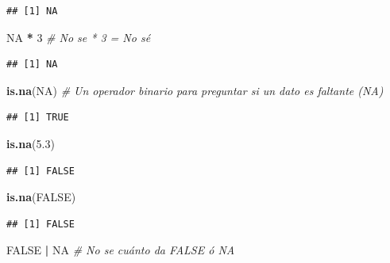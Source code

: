 \documentclass[]{book}
\newenvironment{Shaded}{\begin{snugshade}}{\end{snugshade}}
\newcommand{\KeywordTok}[1]{\textcolor[rgb]{0.13,0.29,0.53}{\textbf{#1}}}
\newcommand{\DecValTok}[1]{\textcolor[rgb]{0.00,0.00,0.81}{#1}}
\newcommand{\FloatTok}[1]{\textcolor[rgb]{0.00,0.00,0.81}{#1}}
\newcommand{\StringTok}[1]{\textcolor[rgb]{0.31,0.60,0.02}{#1}}
\newcommand{\CommentTok}[1]{\textcolor[rgb]{0.56,0.35,0.01}{\textit{#1}}}
\newcommand{\OtherTok}[1]{\textcolor[rgb]{0.56,0.35,0.01}{#1}}
\newcommand{\OperatorTok}[1]{\textcolor[rgb]{0.81,0.36,0.00}{\textbf{#1}}}
\newcommand{\NormalTok}[1]{#1}
\theoremstyle{definition}
\theoremstyle{definition}
\theoremstyle{definition}
\theoremstyle{remark}
\begin{document}
\begin{verbatim}
## [1] NA
\end{verbatim}

\begin{Shaded}
\begin{Highlighting}[]
\OtherTok{NA} \OperatorTok{*}\StringTok{ }\DecValTok{3} \CommentTok{# No se * 3 = No sé}
\end{Highlighting}
\end{Shaded}

\begin{verbatim}
## [1] NA
\end{verbatim}

\begin{Shaded}
\begin{Highlighting}[]
\KeywordTok{is.na}\NormalTok{(}\OtherTok{NA}\NormalTok{) }\CommentTok{# Un operador binario para preguntar si un dato es faltante (NA)}
\end{Highlighting}
\end{Shaded}

\begin{verbatim}
## [1] TRUE
\end{verbatim}

\begin{Shaded}
\begin{Highlighting}[]
\KeywordTok{is.na}\NormalTok{(}\FloatTok{5.3}\NormalTok{)}
\end{Highlighting}
\end{Shaded}

\begin{verbatim}
## [1] FALSE
\end{verbatim}

\begin{Shaded}
\begin{Highlighting}[]
\KeywordTok{is.na}\NormalTok{(}\OtherTok{FALSE}\NormalTok{)}
\end{Highlighting}
\end{Shaded}

\begin{verbatim}
## [1] FALSE
\end{verbatim}

\begin{Shaded}
\begin{Highlighting}[]
\OtherTok{FALSE} \OperatorTok{|}\StringTok{ }\OtherTok{NA} \CommentTok{# No se cuánto da FALSE ó NA}
\end{Highlighting}
\end{Shaded}
\end{document}
